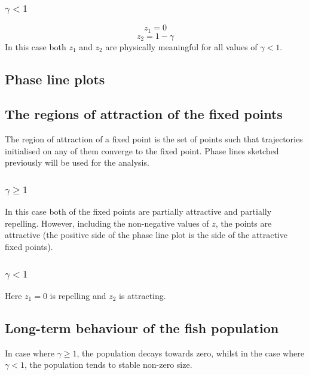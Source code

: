 \documentclass[a4paper]{article}
\begin{document}
\subsubsection{\(\gamma < 1\)}
\[z_1 = 0\]
\[z_2 = 1 - \gamma\]
In this case both $z_1$ and $z_2$ are physically meaningful for all values of \(\gamma < 1\). 

\subsection{Phase line plots}

\subsection{The regions of attraction of the fixed points}
The region of attraction of a fixed point is the set of points such that trajectories initialised on any of them converge to the fixed point. Phase lines sketched previously will be used for the analysis. 
\subsubsection{\(\gamma \geq 1\)}
In this case both of the fixed points are partially attractive and partially repelling. However, including the non-negative values of $z$, the points are attractive (the positive side of the phase line plot is the side of the attractive fixed points). 
\subsubsection{\(\gamma < 1\)}
Here \(z_1 = 0\) is repelling and $z_2$ is attracting.

\subsection{Long-term behaviour of the fish population}
In case where \(\gamma \geq 1\), the population decays towards zero, whilst in the case where \(\gamma < 1\), the population tends to stable non-zero size. 
\end{document}

